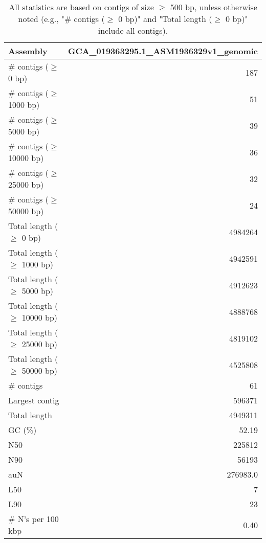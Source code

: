 \documentclass[12pt,a4paper]{article}
\begin{document}
\begin{table}[ht]
\begin{center}
\caption{All statistics are based on contigs of size $\geq$ 500 bp, unless otherwise noted (e.g., "\# contigs ($\geq$ 0 bp)" and "Total length ($\geq$ 0 bp)" include all contigs).}
\begin{tabular}{|l*{1}{|r}|}
\hline
Assembly & GCA\_019363295.1\_ASM1936329v1\_genomic \\ \hline
\# contigs ($\geq$ 0 bp) & 187 \\ \hline
\# contigs ($\geq$ 1000 bp) & 51 \\ \hline
\# contigs ($\geq$ 5000 bp) & 39 \\ \hline
\# contigs ($\geq$ 10000 bp) & 36 \\ \hline
\# contigs ($\geq$ 25000 bp) & 32 \\ \hline
\# contigs ($\geq$ 50000 bp) & 24 \\ \hline
Total length ($\geq$ 0 bp) & 4984264 \\ \hline
Total length ($\geq$ 1000 bp) & 4942591 \\ \hline
Total length ($\geq$ 5000 bp) & 4912623 \\ \hline
Total length ($\geq$ 10000 bp) & 4888768 \\ \hline
Total length ($\geq$ 25000 bp) & 4819102 \\ \hline
Total length ($\geq$ 50000 bp) & 4525808 \\ \hline
\# contigs & 61 \\ \hline
Largest contig & 596371 \\ \hline
Total length & 4949311 \\ \hline
GC (\%) & 52.19 \\ \hline
N50 & 225812 \\ \hline
N90 & 56193 \\ \hline
auN & 276983.0 \\ \hline
L50 & 7 \\ \hline
L90 & 23 \\ \hline
\# N's per 100 kbp & 0.40 \\ \hline
\end{tabular}
\end{center}
\end{table}
\end{document}
